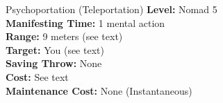 {Psychoportation (Teleportation)}
{
	\textbf{Level:}
	Nomad 5\\
	\textbf{Manifesting Time:}
	1 mental action\\
	\textbf{Range:}
	9 meters (see text)\\
	\textbf{Target:}
	You (see text)\\
	\textbf{Saving Throw:}
	None\\
	\textbf{Cost:}
	See text\\
	\textbf{Maintenance Cost:}
	None (Instantaneous)\\
}
